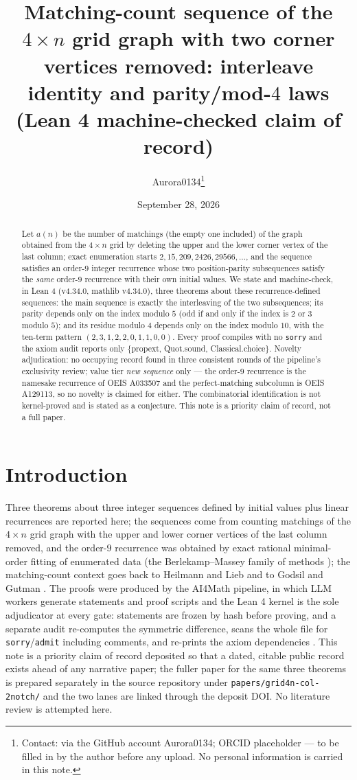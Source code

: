 \documentclass[11pt]{article}
\title{Matching-count sequence of the $4\times n$ grid graph with two corner
vertices removed: interleave identity and parity/mod-$4$ laws\\ (Lean 4
machine-checked claim of record)}
\author{Aurora0134\thanks{Contact: via the GitHub account Aurora0134; ORCID
placeholder --- to be filled in by the author before any upload. No personal
information is carried in this note.}}
\date{September 28, 2026}
\theoremstyle{definition}
\begin{document}
\maketitle

\begin{abstract}
Let $a(n)$ be the number of matchings (the empty one included) of the graph
obtained from the $4\times n$ grid by deleting the upper and the lower corner
vertex of the last column; exact enumeration starts $2, 15, 209, 2426, 29566,
\dots$, and the sequence satisfies an order-$9$ integer recurrence whose two
position-parity subsequences satisfy the \emph{same} order-$9$ recurrence with
their own initial values. We state and machine-check, in Lean 4 (v4.34.0,
mathlib v4.34.0), three theorems about these recurrence-defined sequences: the
main sequence is exactly the interleaving of the two subsequences; its parity
depends only on the index modulo $5$ (odd if and only if the index is $2$ or
$3$ modulo $5$); and its residue modulo $4$ depends only on the index modulo
$10$, with the ten-term pattern $(2,3,1,2,2,0,1,1,0,0)$. Every proof compiles
with no \texttt{sorry} and the axiom audit reports only \{propext, Quot.sound,
Classical.choice\}. Novelty adjudication: no occupying record found in three
consistent rounds of the pipeline's exclusivity review; value tier \emph{new
sequence} only --- the order-$9$ recurrence is the namesake recurrence of OEIS
A033507 and the perfect-matching subcolumn is OEIS A129113, so no novelty is
claimed for either. The combinatorial identification is not kernel-proved and is
stated as a conjecture. This note is a priority claim of record, not a full
paper.
\end{abstract}

\section{Introduction}

Three theorems about three integer sequences defined by initial values plus
linear recurrences are reported here; the sequences come from counting matchings
of the $4\times n$ grid graph with the upper and lower corner vertices of the
last column removed, and the order-$9$ recurrence was obtained by exact rational
minimal-order fitting of enumerated data (the Berlekamp--Massey family of
methods \cite{massey}); the matching-count context goes back to Heilmann and
Lieb and to Godsil and Gutman \cite{heilmann-lieb,godsil-gutman}. The proofs
were produced by the AI4Math pipeline, in which LLM workers generate statements
and proof scripts and the Lean 4 kernel is the sole adjudicator at every gate:
statements are frozen by hash before proving, and a separate audit re-computes
the symmetric difference, scans the whole file for \texttt{sorry}/\texttt{admit}
including comments, and re-prints the axiom dependencies \cite{lean4,mathlib}.
This note is a priority claim of record deposited so that a dated, citable
public record exists ahead of any narrative paper; the fuller paper for the same
three theorems is prepared separately in the source repository under
\texttt{papers/grid4n-col-2notch/} and the two lanes are linked through the
deposit DOI. No literature review is attempted here.
\end{document}
